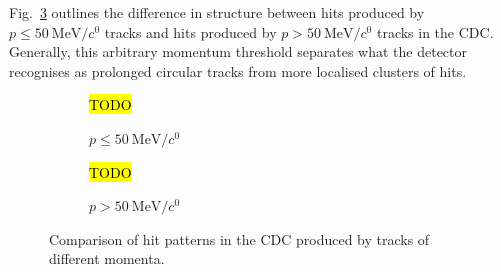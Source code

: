 Fig.~\ref{fig:cdc_rconst_vs_noise} outlines the difference in structure between hits produced by $p\leq\SI{50}{\MeV/\clight}$ tracks and hits produced by $p>\SI{50}{\MeV/\clight}$ tracks in the CDC. Generally, this arbitrary momentum threshold separates what the detector recognises as prolonged circular tracks from more localised clusters of hits.

\begin{figure}
    \centering
    \begin{subfigure}{0.4\textwidth}
        \centering
        \hl{TODO}
        \caption{$p\leq\SI{50}{\MeV/\clight}$}
        \label{fig:cdc_rconst_vs_noise:low}
    \end{subfigure}
    \hfill
    \begin{subfigure}{0.4\textwidth}
        \centering
        \hl{TODO}
        \caption{$p > \SI{50}{\MeV/\clight}$}
        \label{fig:cdc_rconst_vs_noise:high}
    \end{subfigure}
    \caption{Comparison of hit patterns in the CDC produced by tracks of different momenta.}
    \label{fig:cdc_rconst_vs_noise}
\end{figure}




